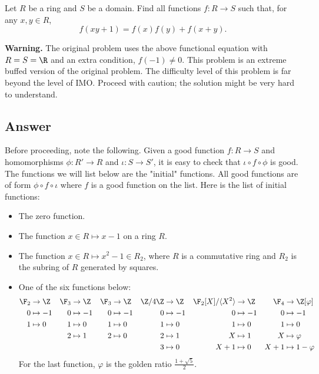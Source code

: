 Let $R$ be a ring and $S$ be a domain.
Find all functions $f : R \to S$ such that, for any $x, y \in R$,
\[ f(xy + 1) = f(x) f(y) + f(x + y). \tag{*}\label{2012a5-eq0} \]

\textbf{Warning.}
The original problem uses the above functional equation with $R = S = \R$ and an extra condition, $f(-1) \neq 0$.
This problem is an extreme buffed version of the original problem.
The difficulty level of this problem is far beyond the level of IMO.
Proceed with caution; the solution might be very hard to understand.







\subsection*{Answer}

Before proceeding, note the following.
Given a good function $f : R \to S$ and homomorphisms $\phi : R' \to R$ and $\iota : S \to S'$, it is easy to check that $\iota \circ f \circ \phi$ is good.
The functions we will list below are the "initial" functions.
All good functions are of form $\phi \circ f \circ \iota$ where $f$ is a good function on the list.
Here is the list of initial functions:

\begin{itemize}
    \item   The zero function.
    \item   The function $x \in R \mapsto x - 1$ on a ring $R$.
    \item   The function $x \in R \mapsto x^2 - 1 \in R_2$, where $R$ is a commutative ring and $R_2$ is the subring of $R$ generated by squares.
    \item   One of the six functions below:
    \begin{align*}
        \F_2 &\to \Z    & \F_3 &\to \Z    & \F_3 &\to \Z    & \Z/4\Z &\to \Z  & \F_2[X]/\langle X^2 \rangle &\to \Z   & \F_4 &\to \Z[\varphi] \\
        0 &\mapsto -1   & 0 &\mapsto -1   & 0 &\mapsto -1   & 0 &\mapsto -1   & 0 &\mapsto -1                         & 0 &\mapsto -1 \\
        1 &\mapsto 0    & 1 &\mapsto 0    & 1 &\mapsto 0    & 1 &\mapsto 0    & 1 &\mapsto 0                          & 1 &\mapsto 0  \\
                       && 2 &\mapsto 1    & 2 &\mapsto 0    & 2 &\mapsto 1    & X &\mapsto 1                          & X &\mapsto \varphi  \\
                                                       &&&&&& 3 &\mapsto 0    & X + 1 &\mapsto 0                      & X + 1 &\mapsto 1 - \varphi
    \end{align*}
    For the last function, $\varphi$ is the golden ratio $\frac{1 + \sqrt{5}}{2}$.
\end{itemize}







